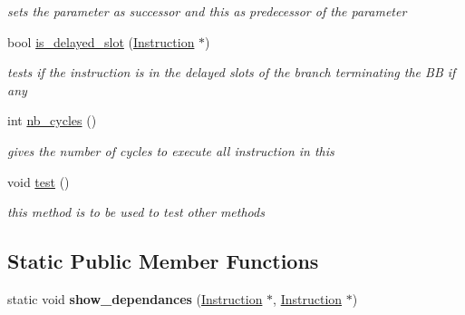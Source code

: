 \begin{DoxyCompactItemize}
\begin{DoxyCompactList}\small\item\em sets the parameter as successor and this as predecessor of the parameter \end{DoxyCompactList}\item 
\hypertarget{class_basic__block_ad156275e42428ee703ffa0aa3e8b5bb0}{bool \hyperlink{class_basic__block_ad156275e42428ee703ffa0aa3e8b5bb0}{is\-\_\-delayed\-\_\-slot} (\hyperlink{class_instruction}{Instruction} $\ast$)}\label{class_basic__block_ad156275e42428ee703ffa0aa3e8b5bb0}

\begin{DoxyCompactList}\small\item\em tests if the instruction is in the delayed slots of the branch terminating the B\-B if any \end{DoxyCompactList}\item 
\hypertarget{class_basic__block_a0a9caa9a904adc7807e390308e7b939c}{int \hyperlink{class_basic__block_a0a9caa9a904adc7807e390308e7b939c}{nb\-\_\-cycles} ()}\label{class_basic__block_a0a9caa9a904adc7807e390308e7b939c}

\begin{DoxyCompactList}\small\item\em gives the number of cycles to execute all instruction in this \end{DoxyCompactList}\item 
\hypertarget{class_basic__block_a0f26ff105216c62082905097b5dcebd3}{void \hyperlink{class_basic__block_a0f26ff105216c62082905097b5dcebd3}{test} ()}\label{class_basic__block_a0f26ff105216c62082905097b5dcebd3}

\begin{DoxyCompactList}\small\item\em this method is to be used to test other methods \end{DoxyCompactList}\end{DoxyCompactItemize}
\subsection*{Static Public Member Functions}
\begin{DoxyCompactItemize}
\item 
\hypertarget{class_basic__block_aef985f2438261d429f81c7b5d4de5f16}{static void {\bfseries show\-\_\-dependances} (\hyperlink{class_instruction}{Instruction} $\ast$, \hyperlink{class_instruction}{Instruction} $\ast$)}\label{class_basic__block_aef985f2438261d429f81c7b5d4de5f16}

\end{DoxyCompactItemize}


